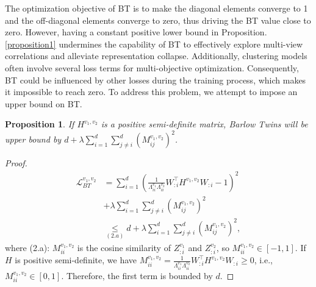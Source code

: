 \documentclass[letterpaper]{article} %
\newtheorem{proposition}{Proposition}
\begin{document}
The optimization objective of BT is to make the diagonal elements converge to 1 and the off-diagonal elements converge to zero, thus driving the BT value close to zero. However, having a constant positive lower bound in Proposition. \ref{proposition1} undermines the capability of BT to effectively explore multi-view correlations and alleviate representation collapse. Additionally, clustering models often involve several loss terms for multi-objective optimization. Consequently, BT could be influenced by other losses during the training process, which makes it impossible to reach zero. To address this problem, we attempt to impose an upper bound on BT.


\begin{proposition}\label{remark1}
If $H^{v_1, v_2}$ is a positive semi-definite matrix,
Barlow Twins will be upper bound by $d+\lambda \sum_{i=1}^{d} \sum_{j \neq i}^d (M^{v_1, v_2}_{i j })^{2}$.
\end{proposition}



\begin{proof}
\begin{equation}
    \begin{aligned}
    \mathcal{L}^{v_1,v_2}_{BT}
    &= \sum_{i=1}^{d} (\frac{1}{\Lambda^{v_1}_{ii} \Lambda^{v_2}_{ii}} {W}_{:i}^{\top} H^{v_1, v_2} {W}_{:i}-1)^{2} \\
    &+\lambda \sum_{i=1}^{d} \sum_{j \neq i}^d (M^{v_1, v_2}_{i j})^{2}\\
    &\underset{(2.a)}{\leq} d+\lambda \sum_{i=1}^{d} \sum_{j \neq i}^d (M^{v_1, v_2}_{i j })^{2},
\end{aligned}
\end{equation}
where (2.a): $M^{v_1, v_2}_{i i}$ is the cosine similarity of $Z^{v_{1}}_{: i}$ and $Z^{v_{2}}_{: i}$, so $M^{v_1, v_2}_{ i i }\in [-1,1]$. If $H$ is  positive semi-definite, we have $M^{v_1, v_2}_{i i}=\frac{1}{\Lambda^{v_1}_{ii} \Lambda^{v_2}_{ii}} {W}_{:i}^{\top} H^{v_1, v_2} {W}_{:i} \geq 0 $, i.e., $M^{v_1, v_2}_{ i i }\in [0,1]$. Therefore, the first term is bounded by $d$.
\end{proof}
\end{document}
